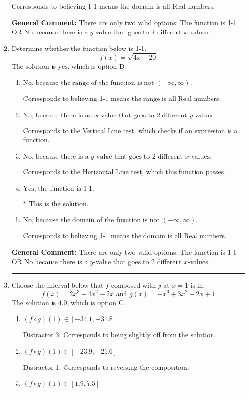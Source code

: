\documentclass{extbook}[14pt]
\newcommand{\litem}[1]{\item #1

\rule{\textwidth}{0.4pt}}
\begin{document}
\begin{enumerate}
{\begin{enumerate}[label=\Alph*.]
Corresponds to believing 1-1 means the domain is all Real numbers.
\end{enumerate}

\textbf{General Comment:} There are only two valid options: The function is 1-1 OR No because there is a $y$-value that goes to 2 different $x$-values.
}
\litem{
Determine whether the function below is 1-1.
\[ f(x) = \sqrt{4 x - 20} \]The solution is \( \text{yes} \), which is option D.\begin{enumerate}[label=\Alph*.]
\item \( \text{No, because the range of the function is not $(-\infty, \infty)$.} \)

Corresponds to believing 1-1 means the range is all Real numbers.
\item \( \text{No, because there is an $x$-value that goes to 2 different $y$-values.} \)

Corresponds to the Vertical Line test, which checks if an expression is a function.
\item \( \text{No, because there is a $y$-value that goes to 2 different $x$-values.} \)

Corresponds to the Horizontal Line test, which this function passes.
\item \( \text{Yes, the function is 1-1.} \)

* This is the solution.
\item \( \text{No, because the domain of the function is not $(-\infty, \infty)$.} \)

Corresponds to believing 1-1 means the domain is all Real numbers.
\end{enumerate}

\textbf{General Comment:} There are only two valid options: The function is 1-1 OR No because there is a $y$-value that goes to 2 different $x$-values.
}
\litem{
Choose the interval below that $f$ composed with $g$ at $x=1$ is in.
\[ f(x) = 2x^{3} +4 x^{2} -2 x \text{ and } g(x) = -x^{3} +3 x^{2} -2 x + 1 \]The solution is \( 4.0 \), which is option C.\begin{enumerate}[label=\Alph*.]
\item \( (f \circ g)(1) \in [-34.1, -31.8] \)

 Distractor 3: Corresponds to being slightly off from the solution.
\item \( (f \circ g)(1) \in [-23.9, -21.6] \)

 Distractor 1: Corresponds to reversing the composition.
\item \( (f \circ g)(1) \in [1.9, 7.5] \)


\end{enumerate}}
\end{enumerate}
\end{document}
